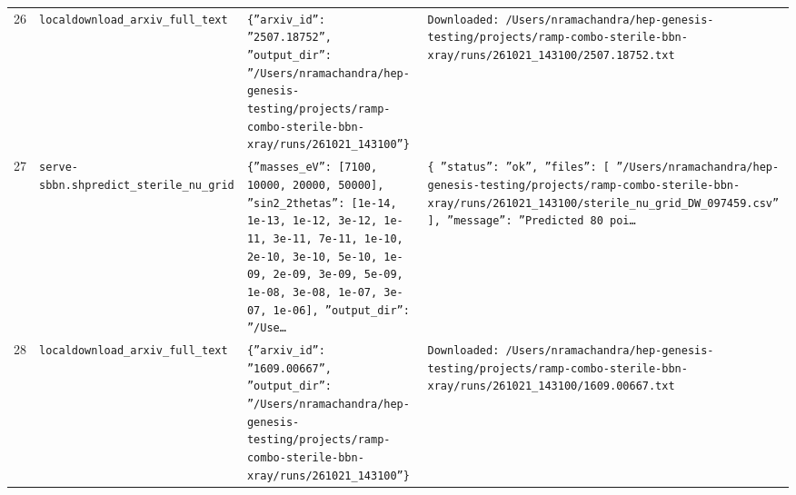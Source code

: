 \documentclass[11pt,a4paper]{article}
\begin{document}
\begin{longtable}{@{}p{}p{}p{}p{}@{}}
26 & \texttt{local}\newline\texttt{download\_\allowbreak{}arxiv\_\allowbreak{}full\_\allowbreak{}text} & \texttt{\{''arxiv\_\allowbreak{}id'':\allowbreak{} ''2507.18752'',\allowbreak{} ''output\_\allowbreak{}dir'':\allowbreak{} ''/\allowbreak{}Users/\allowbreak{}nramachandra/\allowbreak{}hep-genesis-testing/\allowbreak{}projects/\allowbreak{}ramp-combo-sterile-bbn-xray/\allowbreak{}runs/\allowbreak{}261021\_\allowbreak{}143100''\}\allowbreak{}} & \texttt{Downloaded:\allowbreak{} /\allowbreak{}Users/\allowbreak{}nramachandra/\allowbreak{}hep-genesis-testing/\allowbreak{}projects/\allowbreak{}ramp-combo-sterile-bbn-xray/\allowbreak{}runs/\allowbreak{}261021\_\allowbreak{}143100/\allowbreak{}2507.18752.txt} \\
27 & \texttt{serve-sbbn.sh}\newline\texttt{predict\_\allowbreak{}sterile\_\allowbreak{}nu\_\allowbreak{}grid} & \texttt{\{''masses\_\allowbreak{}eV'':\allowbreak{} [7100,\allowbreak{} 10000,\allowbreak{} 20000,\allowbreak{} 50000]\allowbreak{},\allowbreak{} ''sin2\_\allowbreak{}2thetas'':\allowbreak{} [1e-14,\allowbreak{} 1e-13,\allowbreak{} 1e-12,\allowbreak{} 3e-12,\allowbreak{} 1e-11,\allowbreak{} 3e-11,\allowbreak{} 7e-11,\allowbreak{} 1e-10,\allowbreak{} 2e-10,\allowbreak{} 3e-10,\allowbreak{} 5e-10,\allowbreak{} 1e-09,\allowbreak{} 2e-09,\allowbreak{} 3e-09,\allowbreak{} 5e-09,\allowbreak{} 1e-08,\allowbreak{} 3e-08,\allowbreak{} 1e-07,\allowbreak{} 3e-07,\allowbreak{} 1e-06]\allowbreak{},\allowbreak{} ''output\_\allowbreak{}dir'':\allowbreak{} ''/\allowbreak{}Use\ldots{}\allowbreak{}} & \texttt{\{   ''status'':\allowbreak{} ''ok'',\allowbreak{}   ''files'':\allowbreak{} [     ''/\allowbreak{}Users/\allowbreak{}nramachandra/\allowbreak{}hep-genesis-testing/\allowbreak{}projects/\allowbreak{}ramp-combo-sterile-bbn-xray/\allowbreak{}runs/\allowbreak{}261021\_\allowbreak{}143100/\allowbreak{}sterile\_\allowbreak{}nu\_\allowbreak{}grid\_\allowbreak{}DW\_\allowbreak{}097459.csv''   ]\allowbreak{},\allowbreak{}   ''message'':\allowbreak{} ''Predicted 80 poi\ldots{}\allowbreak{}} \\
28 & \texttt{local}\newline\texttt{download\_\allowbreak{}arxiv\_\allowbreak{}full\_\allowbreak{}text} & \texttt{\{''arxiv\_\allowbreak{}id'':\allowbreak{} ''1609.00667'',\allowbreak{} ''output\_\allowbreak{}dir'':\allowbreak{} ''/\allowbreak{}Users/\allowbreak{}nramachandra/\allowbreak{}hep-genesis-testing/\allowbreak{}projects/\allowbreak{}ramp-combo-sterile-bbn-xray/\allowbreak{}runs/\allowbreak{}261021\_\allowbreak{}143100''\}\allowbreak{}} & \texttt{Downloaded:\allowbreak{} /\allowbreak{}Users/\allowbreak{}nramachandra/\allowbreak{}hep-genesis-testing/\allowbreak{}projects/\allowbreak{}ramp-combo-sterile-bbn-xray/\allowbreak{}runs/\allowbreak{}261021\_\allowbreak{}143100/\allowbreak{}1609.00667.txt} \\

\end{longtable}
\end{document}
